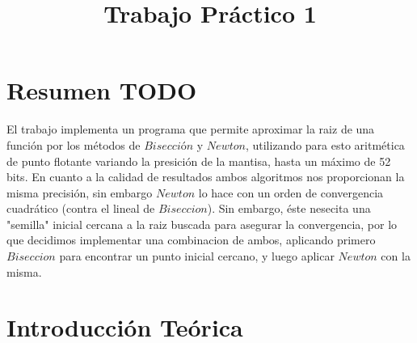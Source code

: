 \documentclass[a4paper]{article}
\title{Trabajo Práctico 1}
\begin{document}
\maketitle
\newpage

\tableofcontents


\newpage
\section{Resumen TODO}
El trabajo implementa un programa que permite aproximar la raiz de una función por los métodos de $Bisección$ y $Newton$, utilizando para esto aritmética de punto flotante variando la presición de la mantisa, hasta un máximo de 52 bits. En cuanto a la calidad de resultados ambos algoritmos nos proporcionan la misma precisión, sin embargo $Newton$ lo hace con un orden de convergencia cuadrático (contra el lineal de $Biseccion$). Sin embargo, éste nesecita una "semilla" inicial cercana a la raiz buscada para asegurar la convergencia, por lo que decidimos implementar una combinacion de ambos, aplicando primero $Biseccion$ para encontrar un punto inicial cercano, y luego aplicar $Newton$ con la misma.  


\section{Introducción Teórica}
\end{document}

